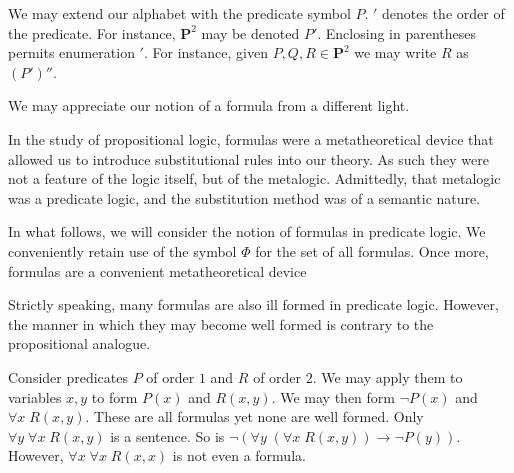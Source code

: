 \documentclass{amsbook}
\newcommand{\univ}[1]{\mathord\forall#1\;}
\newcommand{\then}{\mathrel\rightarrow}
\theoremstyle{definition}
\begin{document}
We may extend our alphabet with the predicate symbol $P$. $'$ denotes the order of the predicate. For instance, $\mathbf P^2$ may be denoted $P'$. Enclosing in parentheses permits enumeration $'$. For instance, given $P, Q, R \in \mathbf P^2$ we may write $R$ as $(P')''$.


We may appreciate our notion of a formula from a different light.

In the study of propositional logic, formulas were a metatheoretical device that allowed us to introduce substitutional rules into our theory. As such they were not a feature of the logic itself, but of the metalogic. Admittedly, that metalogic was a predicate logic, and the substitution method was of a semantic nature.

In what follows, we will consider the notion of formulas in predicate logic. We conveniently retain use of the symbol $\Phi$ for the set of all formulas. Once more, formulas are a convenient metatheoretical device

Strictly speaking, many formulas are also ill formed in predicate logic. However, the manner in which they may become well formed is contrary to the propositional analogue.

Consider predicates $P$ of order $1$ and $R$ of order $2$. We may apply them to variables $x, y$ to form $P(x)$ and $R(x,y)$. We may then form $\neg P(x)$ and $\univ x R(x, y)$. These are all formulas yet none are well formed. Only $\univ y \univ x R(x,y)$ is a sentence. So is $\neg(\univ y (\univ x R(x,y)) \then \neg P(y))$. However, $\univ x \univ x R(x, x)$ is not even a formula.
\end{document}

